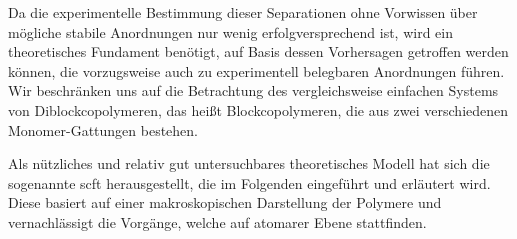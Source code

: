 \documentclass[../main.tex]{subfiles}
\begin{document}
Da die experimentelle Bestimmung dieser Separationen ohne Vorwissen über mögliche stabile Anordnungen nur wenig erfolgversprechend ist, wird ein theoretisches Fundament benötigt, auf Basis dessen Vorhersagen getroffen werden können, die vorzugsweise auch zu experimentell belegbaren Anordnungen führen.
Wir beschränken uns auf die Betrachtung des vergleichsweise einfachen Systems von Diblockcopolymeren, das heißt Blockcopolymeren, die aus zwei verschiedenen Monomer-Gattungen bestehen.

Als nützliches und relativ gut untersuchbares theoretisches Modell hat sich die sogenannte \ac{scft} herausgestellt, die im Folgenden eingeführt und erläutert wird.
Diese basiert auf einer makroskopischen Darstellung der Polymere und vernachlässigt die Vorgänge, welche auf atomarer Ebene stattfinden.
\end{document}
